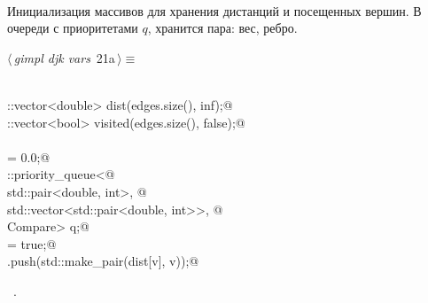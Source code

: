 \documentclass[12pt]{article}
\begin{document}
\paragraph{}
Инициализация массивов для хранения дистанций и посещенных вершин.
В очереди с приоритетами $q$, хранится пара: вес, ребро.
\begin{flushleft} \small
\begin{minipage}{\linewidth}\label{scrap37}\raggedright\small
{} $\langle\,${\itshape gimpl djk vars}\nobreak\ {\footnotesize {21a}}$\,\rangle\equiv$
\vspace{-1ex}
\begin{list}{}{} \item
\mbox{}\verb@@\\
\mbox{}\verb@std::vector<double> dist(edges.size(), inf);@\\
\mbox{}\verb@std::vector<bool> visited(edges.size(), false);@\\
\mbox{}\verb@@\\
\mbox{}\verb@dist[v] = 0.0;@\\
\mbox{}\verb@std::priority_queue<@\\
\mbox{}\verb@  std::pair<double, int>, @\\
\mbox{}\verb@  std::vector<std::pair<double, int>>, @\\
\mbox{}\verb@  Compare> q;@\\
\mbox{}\verb@visited[v] = true;@\\
\mbox{}\verb@q.push(std::make_pair(dist[v], v));@\\
\mbox{}\verb@@{\NWsep}
\end{list}
\vspace{-1.5ex}
\footnotesize
\begin{list}{}{\setlength{\itemsep}{-\parsep}\setlength{\itemindent}{-\leftmargin}}
\item \NWtxtMacroRefIn\ .

\item{}
\end{list}
\end{minipage}\vspace{4ex}
\end{flushleft}
\end{document}
